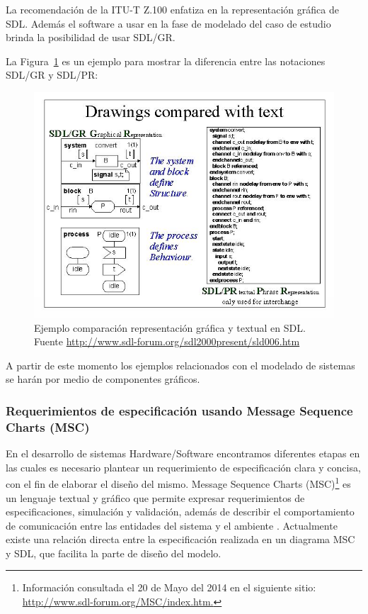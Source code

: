 La recomendaci\'on de la ITU-T Z.100 enfatiza en la representaci\'on gr\'afica 
de SDL. Adem\'as el software a usar en la fase de modelado del caso de estudio 
brinda la posibilidad de usar SDL/GR. 

La Figura~\ref{fig:SDLGR_PR} es un ejemplo para mostrar la diferencia entre las notaciones SDL/GR y SDL/PR:

\begin{figure}[H]
  \centering
  \includegraphics[scale=0.6]{./images/EjemploSDLGR_SDLPR.jpg}
  \caption{Ejemplo comparaci\'on representaci\'on gr\'afica y textual en 
SDL. Fuente \url{http://www.sdl-forum.org/sdl2000present/sld006.htm}}
  \label{fig:SDLGR_PR}
\end{figure}

A partir de este momento los ejemplos relacionados con el modelado de sistemas 
se har\'an por medio de componentes gr\'aficos.

\subsubsection{Requerimientos de especificaci\'on usando Message Sequence Charts 
(MSC)}

En el desarrollo de sistemas Hardware/Software encontramos diferentes etapas en 
las cuales es necesario plantear un requerimiento de especificaci\'on clara y 
concisa, con el fin de elaborar el dise\~no del mismo. Message Sequence Charts 
(MSC)\footnote{Informaci\'on consultada el 20 de Mayo del 2014 en el siguiente 
sitio: \url{http://www.sdl-forum.org/MSC/index.htm.}} es un lenguaje textual y 
gr\'afico que permite expresar requerimientos de especificaciones, simulaci\'on 
y validaci\'on, adem\'as de describir el comportamiento de comunicaci\'on entre las entidades del sistema y el ambiente \cite{Ebner}.  Actualmente existe una relaci\'on directa entre la 
especificaci\'on realizada en un diagrama MSC y SDL, que facilita la parte de 
dise\~no del modelo. 

